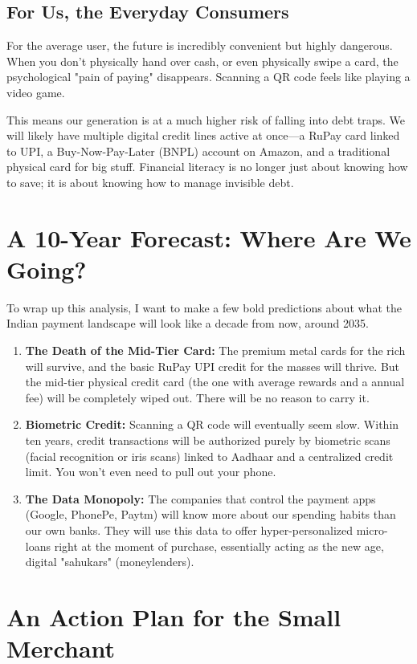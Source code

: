 \subsection{For Us, the Everyday Consumers}
For the average user, the future is incredibly convenient but highly dangerous. When you don't physically hand over cash, or even physically swipe a card, the psychological "pain of paying" disappears. Scanning a QR code feels like playing a video game.

This means our generation is at a much higher risk of falling into debt traps. We will likely have multiple digital credit lines active at once---a RuPay card linked to UPI, a Buy-Now-Pay-Later (BNPL) account on Amazon, and a traditional physical card for big stuff. Financial literacy is no longer just about knowing how to save; it is about knowing how to manage invisible debt.

\section{A 10-Year Forecast: Where Are We Going?}

To wrap up this analysis, I want to make a few bold predictions about what the Indian payment landscape will look like a decade from now, around 2035.

\begin{enumerate}
    \item \textbf{The Death of the Mid-Tier Card:} The premium metal cards for the rich will survive, and the basic RuPay UPI credit for the masses will thrive. But the mid-tier physical credit card (the one with average rewards and a  annual fee) will be completely wiped out. There will be no reason to carry it.
    \item \textbf{Biometric Credit:} Scanning a QR code will eventually seem slow. Within ten years, credit transactions will be authorized purely by biometric scans (facial recognition or iris scans) linked to Aadhaar and a centralized credit limit. You won't even need to pull out your phone.
    \item \textbf{The Data Monopoly:} The companies that control the payment apps (Google, PhonePe, Paytm) will know more about our spending habits than our own banks. They will use this data to offer hyper-personalized micro-loans right at the moment of purchase, essentially acting as the new age, digital "sahukars" (moneylenders).
\end{enumerate}

\section{An Action Plan for the Small Merchant}

